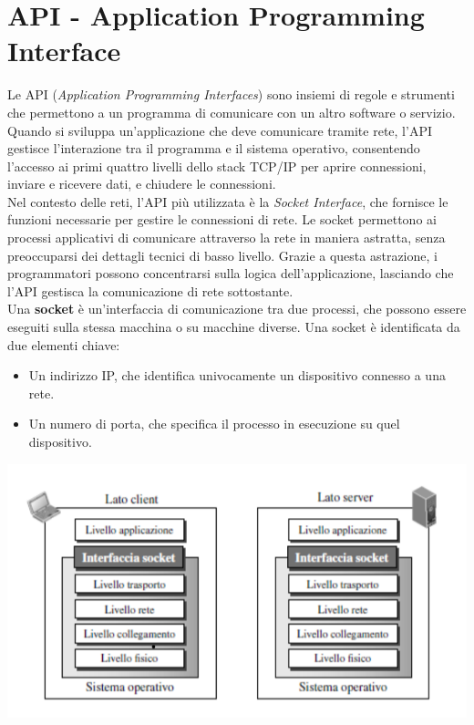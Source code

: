 \documentclass[12pt]{report}
\begin{document}
	\section{API - Application Programming Interface}
	Le API (\textit{Application Programming Interfaces}) sono insiemi di regole e strumenti che permettono a un programma di comunicare con un altro software o servizio. Quando si sviluppa un'applicazione che deve comunicare tramite rete, l'API gestisce l'interazione tra il programma e il sistema operativo, consentendo l'accesso ai primi quattro livelli dello stack TCP/IP per aprire connessioni, inviare e ricevere dati, e chiudere le connessioni.
	\vspace{\baselineskip}\\
	Nel contesto delle reti, l'API più utilizzata è la \textit{Socket Interface}, che fornisce le funzioni necessarie per gestire le connessioni di rete. Le socket permettono ai processi applicativi di comunicare attraverso la rete in maniera astratta, senza preoccuparsi dei dettagli tecnici di basso livello. Grazie a questa astrazione, i programmatori possono concentrarsi sulla logica dell'applicazione, lasciando che l'API gestisca la comunicazione di rete sottostante.
	\vspace{\baselineskip}\\
	Una \textbf{socket} è un'interfaccia di comunicazione tra due processi, che possono essere eseguiti sulla stessa macchina o su macchine diverse. Una socket è identificata da due elementi chiave:
	\begin{itemize}
		\item Un indirizzo IP, che identifica univocamente un dispositivo connesso a una rete.
		\item Un numero di porta, che specifica il processo in esecuzione su quel dispositivo.
	\end{itemize}
	\begin{center}
		\includegraphics[scale=0.5]{assets/socket-int.png}	
	\end{center}
\end{document}
